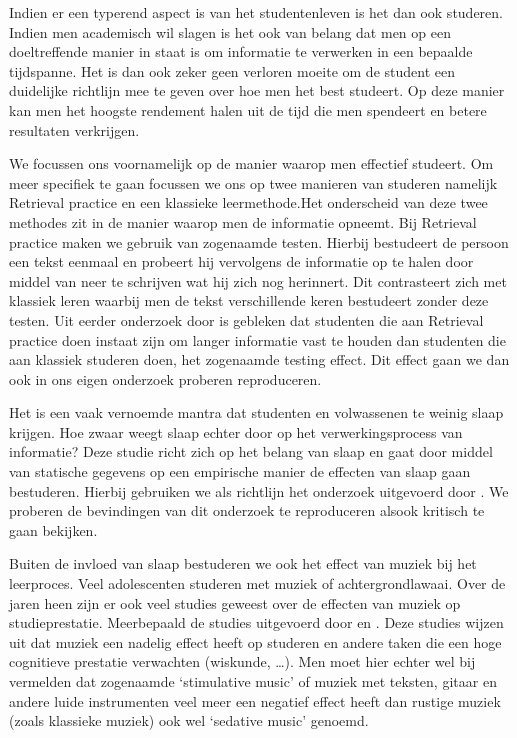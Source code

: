 \documentclass{hogent-article}
\begin{document}
Indien er een typerend aspect is van het studentenleven is het dan ook studeren. Indien men academisch wil slagen is het ook van belang dat men op een doeltreffende manier in staat is om informatie te verwerken in een bepaalde tijdspanne. Het is dan ook zeker geen verloren moeite om de student een duidelijke richtlijn mee te geven over hoe men het best studeert. Op deze manier kan men het hoogste rendement halen uit de tijd die men spendeert en betere resultaten verkrijgen.\\
\par
\noindent
We focussen ons voornamelijk op de manier waarop men effectief studeert. Om meer specifiek te gaan focussen we ons op twee manieren van studeren namelijk Retrieval practice  en een klassieke leermethode.Het onderscheid van deze twee methodes zit in de manier waarop men de informatie opneemt. Bij Retrieval practice maken we gebruik van zogenaamde testen. Hierbij bestudeert de persoon een tekst eenmaal en probeert hij vervolgens de informatie op te halen door middel van neer te schrijven wat hij zich nog herinnert. Dit contrasteert zich met klassiek leren waarbij men de tekst verschillende keren bestudeert zonder deze testen. Uit eerder onderzoek door \textcite{Roediger2006} is gebleken dat studenten die aan Retrieval practice doen instaat zijn om langer informatie vast te houden dan studenten die aan klassiek studeren doen, het zogenaamde testing effect. Dit effect gaan we dan ook in ons eigen onderzoek proberen reproduceren.\\
\par
\noindent
Het is een vaak vernoemde mantra dat studenten en volwassenen te weinig slaap krijgen. Hoe zwaar weegt slaap echter door op het verwerkingsprocess van informatie? Deze studie richt zich op het belang van slaap en gaat door middel van statische gegevens op een empirische manier de effecten van slaap gaan bestuderen. Hierbij gebruiken we als richtlijn het onderzoek uitgevoerd door \textcite{Potkin2012}. We proberen de bevindingen van dit onderzoek te reproduceren alsook kritisch te gaan bekijken.\\
\par
\noindent
Buiten de invloed van slaap bestuderen we ook het effect van muziek bij het leerproces. Veel adolescenten studeren met muziek of achtergrondlawaai. Over de jaren heen zijn er ook veel studies geweest over de effecten van muziek op studieprestatie. Meerbepaald de studies uitgevoerd door \textcite{Smith1977} en \textcite{Dolegui2013}. Deze studies wijzen uit dat muziek een nadelig effect heeft op studeren en andere taken die een hoge cognitieve prestatie verwachten (wiskunde, …). Men moet hier echter wel bij vermelden dat zogenaamde ‘stimulative music’ of muziek met teksten, gitaar en andere luide instrumenten veel meer een negatief effect heeft dan rustige muziek (zoals klassieke muziek) ook wel ‘sedative music’ genoemd.\\
\end{document}
